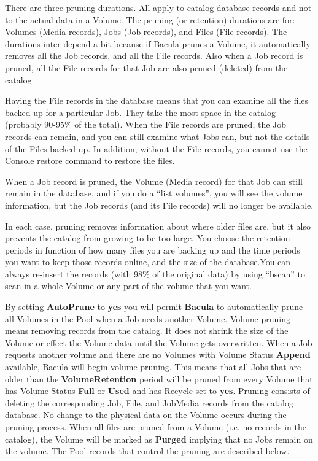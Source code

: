 There are three pruning durations. All apply to catalog database records and
not to the actual data in a Volume. The pruning (or retention) durations are
for: Volumes (Media records), Jobs (Job records), and Files (File records).
The durations inter-depend a bit because if Bacula prunes a Volume, it
automatically removes all the Job records, and all the File records. Also when
a Job record is pruned, all the File records for that Job are also pruned
(deleted) from the catalog. 

Having the File records in the database means that you can examine all the
files backed up for a particular Job. They take the most space in the catalog
(probably 90-95\% of the total). When the File records are pruned, the Job
records can remain, and you can still examine what Jobs ran, but not the
details of the Files backed up. In addition, without the File records, you
cannot use the Console restore command to restore the files. 

When a Job record is pruned, the Volume (Media record) for that Job can still
remain in the database, and if you do a ``list volumes'', you will see the
volume information, but the Job records (and its File records) will no longer
be available. 

In each case, pruning removes information about where older files are, but it
also prevents the catalog from growing to be too large. You choose the
retention periods in function of how many files you are backing up and the
time periods you want to keep those records online, and the size of the
database.You can always re-insert the records (with 98\% of the original data)
by using ``bscan'' to scan in a whole Volume or any part of the volume that
you want. 

By setting {\bf AutoPrune} to {\bf yes} you will permit {\bf Bacula} to
automatically prune all Volumes in the Pool when a Job needs another Volume.
Volume pruning means removing records from the catalog. It does not shrink the
size of the Volume or effect the Volume data until the Volume gets
overwritten. When a Job requests another volume and there are no Volumes with
Volume Status {\bf Append} available, Bacula will begin volume pruning. This
means that all Jobs that are older than the {\bf VolumeRetention} period will
be pruned from every Volume that has Volume Status {\bf Full} or {\bf Used}
and has Recycle set to {\bf yes}. Pruning consists of deleting the
corresponding Job, File, and JobMedia records from the catalog database. No
change to the physical data on the Volume occurs during the pruning process.
When all files are pruned from a Volume (i.e. no records in the catalog), the
Volume will be marked as {\bf Purged} implying that no Jobs remain on the
volume. The Pool records that control the pruning are described below. 


